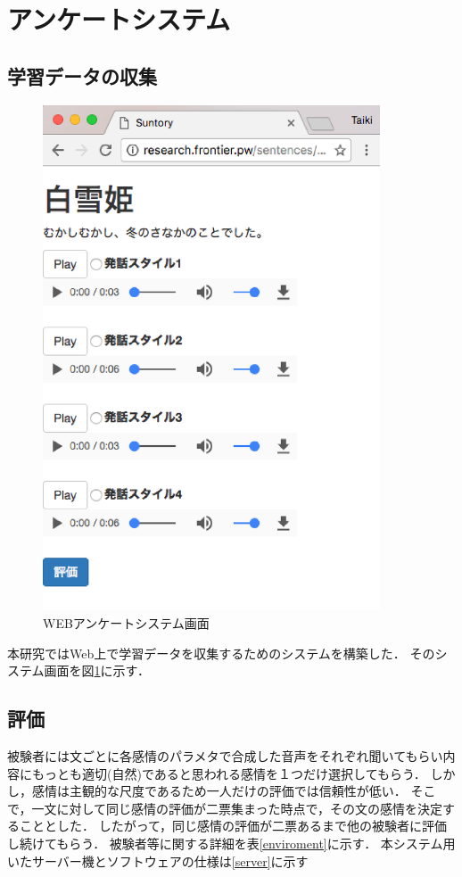 \section{アンケートシステム}

\subsection{学習データの収集}
\begin{figure}[h]
  \begin{center}
    \includegraphics[clip,width=10.0cm]{fig/web.eps}
    \caption{WEBアンケートシステム画面}
    \label{fig:web}
  \end{center}
\end{figure}

本研究ではWeb上で学習データを収集するためのシステムを構築した．
そのシステム画面を図\ref{fig:web}に示す．

\subsection{}
\subsection{評価}
被験者には文ごとに各感情のパラメタで合成した音声をそれぞれ聞いてもらい内容にもっとも適切(自然)であると思われる感情を１つだけ選択してもらう．
しかし，感情は主観的な尺度であるため一人だけの評価では信頼性が低い．
そこで，一文に対して同じ感情の評価が二票集まった時点で，その文の感情を決定することとした．
したがって，同じ感情の評価が二票あるまで他の被験者に評価し続けてもらう．
被験者等に関する詳細を表\ref{enviroment}に示す．
本システム用いたサーバー機とソフトウェアの仕様は\ref{server}に示す

